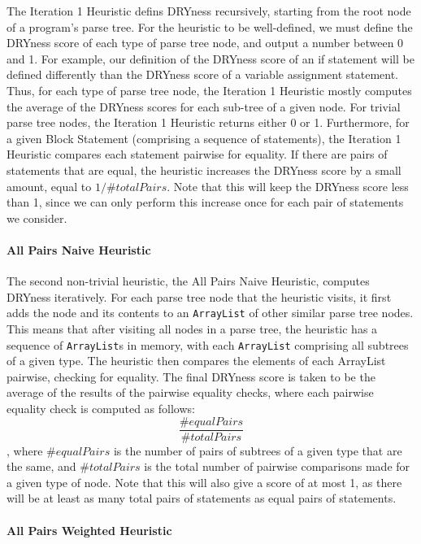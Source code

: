 \documentclass{article}
\begin{document}
The Iteration 1 Heuristic defins DRYness recursively, 
starting from the root node of a program's parse tree. For the heuristic to be well-defined, we must define the DRYness score of
each type of parse tree node, and output a number between 0 and 1. For example, our definition of the DRYness score of an if statement
will be defined differently than the DRYness score of a variable assignment statement. Thus, for each type of parse tree node,
the Iteration 1 Heuristic mostly computes the average of the DRYness scores for each sub-tree of a given node. For trivial parse
tree nodes, the Iteration 1 Heuristic returns either 0 or 1. Furthermore, for a given Block Statement (comprising a sequence of statements), 
the Iteration 1 Heuristic compares each statement pairwise for equality. If there are pairs of statements that are equal, the 
heuristic increases the DRYness score by a small amount, equal to $1/\#totalPairs$. Note that this will keep the DRYness score
less than 1, since we can only perform this increase once for each pair of statements we consider.

\paragraph{All Pairs Naive Heuristic}

The second non-trivial heuristic, the All Pairs Naive Heuristic, computes DRYness iteratively. 
For each parse tree node that the heuristic visits, it first adds the node and its contents to an \texttt{ArrayList} of other similar
parse tree nodes. This means that after visiting all nodes in a parse tree, the heuristic has a sequence of \texttt{ArrayList}s
in memory, with each \texttt{ArrayList} comprising all subtrees of a given type. The heuristic then compares the elements of each
ArrayList pairwise, checking for equality. The final DRYness score is taken to be the average of the results of the pairwise equality checks,
where each pairwise equality check is computed as follows: $$\frac{\#equalPairs}{\#totalPairs}$$, where $\#equalPairs$ is the
number of pairs of subtrees of a given type that are the same, and $\#totalPairs$ is the total number of pairwise comparisons made
for a given type of node. Note that this will also give a score of at most 1, as there will be at least as many total pairs of statements
as equal pairs of statements.

\paragraph{All Pairs Weighted Heuristic}
\end{document}

